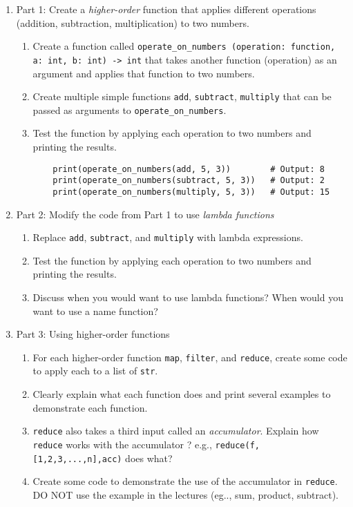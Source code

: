 \documentclass[oneside,11pt,dvipsnames]{book}
\newcommand{\code}[1]{\texttt{#1}}
\begin{document}
\begin{enumerate}
\item Part 1: Create a \emph{higher-order} function that applies different operations (addition, subtraction, multiplication) to two numbers.
\begin{enumerate}
\item Create a function called \code{operate\_on\_numbers (operation: function, a: int, b: int) -> int} that takes another function (operation) as an argument and applies that function to two numbers.
\item Create multiple simple functions \code{add}, \code{subtract}, \code{multiply} that can be passed as arguments to \code{operate\_on\_numbers}.
\item Test the function by applying each operation to two numbers and printing the results.
\begin{lstlisting}
    print(operate_on_numbers(add, 5, 3))        # Output: 8
    print(operate_on_numbers(subtract, 5, 3))   # Output: 2
    print(operate_on_numbers(multiply, 5, 3))   # Output: 15
\end{lstlisting}

\end{enumerate}

\item Part 2: Modify the code from Part 1 to use \emph{lambda functions} 
\begin{enumerate}
\item Replace \code{add}, \code{subtract}, and \code{multiply} with lambda expressions.
\item Test the function by applying each operation to two numbers and printing the results.
\item Discuss when you would want to use lambda functions? When would you want to use a name function?
\end{enumerate}

\item Part 3: Using higher-order functions
\begin{enumerate}
\item For each higher-order function \code{map}, \code{filter}, and \code{reduce}, create some code to apply each to a list of \code{str}.
\item Clearly explain what each function does and print several examples to demonstrate each function.
\item \code{reduce} also takes a third input called an \emph{accumulator}.  Explain how \code{reduce} works with the accumulator ? e.g., \code{reduce(f,[1,2,3,...,n],acc)} does what?
\item Create some code to demonstrate the use of the accumulator in \code{reduce}. DO NOT use the example in the lectures (eg.., sum, product, subtract).
\end{enumerate}


\end{enumerate}
\end{document}
